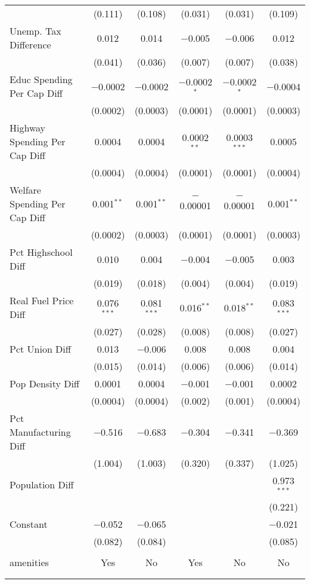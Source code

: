 \begin{table}[!htbp]
\begin{tabular}{@{\extracolsep{5pt}}lccccc}
  & (0.111) & (0.108) & (0.031) & (0.031) & (0.109) \\ 
  Unemp. Tax Difference & 0.012 & 0.014 & $-$0.005 & $-$0.006 & 0.012 \\ 
  & (0.041) & (0.036) & (0.007) & (0.007) & (0.038) \\ 
  Educ Spending Per Cap Diff & $-$0.0002 & $-$0.0002 & $-$0.0002$^{*}$ & $-$0.0002$^{*}$ & $-$0.0004 \\ 
  & (0.0002) & (0.0003) & (0.0001) & (0.0001) & (0.0003) \\ 
  Highway Spending Per Cap Diff & 0.0004 & 0.0004 & 0.0002$^{**}$ & 0.0003$^{***}$ & 0.0005 \\ 
  & (0.0004) & (0.0004) & (0.0001) & (0.0001) & (0.0004) \\ 
  Welfare Spending Per Cap Diff & 0.001$^{**}$ & 0.001$^{**}$ & $-$0.00001 & $-$0.00001 & 0.001$^{**}$ \\ 
  & (0.0002) & (0.0003) & (0.0001) & (0.0001) & (0.0003) \\ 
  Pct Highschool Diff & 0.010 & 0.004 & $-$0.004 & $-$0.005 & 0.003 \\ 
  & (0.019) & (0.018) & (0.004) & (0.004) & (0.019) \\ 
  Real Fuel Price Diff & 0.076$^{***}$ & 0.081$^{***}$ & 0.016$^{**}$ & 0.018$^{**}$ & 0.083$^{***}$ \\ 
  & (0.027) & (0.028) & (0.008) & (0.008) & (0.027) \\ 
  Pct Union Diff & 0.013 & $-$0.006 & 0.008 & 0.008 & 0.004 \\ 
  & (0.015) & (0.014) & (0.006) & (0.006) & (0.014) \\ 
  Pop Density Diff & 0.0001 & 0.0004 & $-$0.001 & $-$0.001 & 0.0002 \\ 
  & (0.0004) & (0.0004) & (0.002) & (0.001) & (0.0004) \\ 
  Pct Manufacturing Diff & $-$0.516 & $-$0.683 & $-$0.304 & $-$0.341 & $-$0.369 \\ 
  & (1.004) & (1.003) & (0.320) & (0.337) & (1.025) \\ 
  Population Diff &  &  &  &  & 0.973$^{***}$ \\ 
  &  &  &  &  & (0.221) \\ 
  Constant & $-$0.052 & $-$0.065 &  &  & $-$0.021 \\ 
  & (0.082) & (0.084) &  &  & (0.085) \\ 
 \hline \\[-1.8ex] 
amenities & Yes & No & Yes & No & No \\ 
\hline \\[-1.8ex] 
\hline 
\hline \\[-1.8ex] 
\end{tabular} 
\end{table} 
